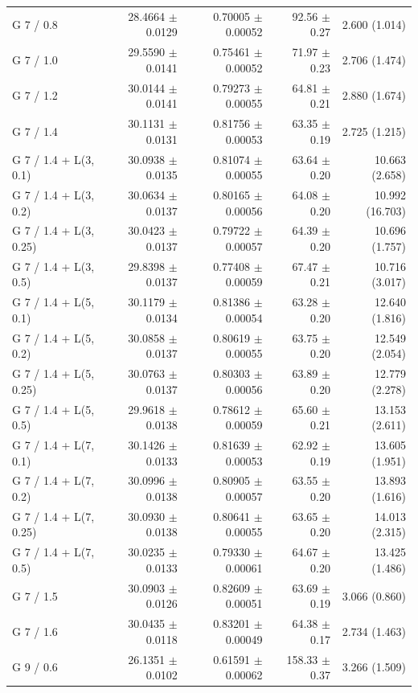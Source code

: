 \begin{longtable}{lrrrr}
G 7 / 0.8 & 28.4664 $\pm$ 0.0129 & 0.70005 $\pm$ 0.00052 & 92.56 $\pm$ 0.27 & 2.600 (1.014) \\
G 7 / 1.0 & 29.5590 $\pm$ 0.0141 & 0.75461 $\pm$ 0.00052 & 71.97 $\pm$ 0.23 & 2.706 (1.474) \\
G 7 / 1.2 & 30.0144 $\pm$ 0.0141 & 0.79273 $\pm$ 0.00055 & 64.81 $\pm$ 0.21 & 2.880 (1.674) \\
G 7 / 1.4 & 30.1131 $\pm$ 0.0131 & 0.81756 $\pm$ 0.00053 & 63.35 $\pm$ 0.19 & 2.725 (1.215) \\
G 7 / 1.4 + L(3, 0.1) & 30.0938 $\pm$ 0.0135 & 0.81074 $\pm$ 0.00055 & 63.64 $\pm$ 0.20 & 10.663 (2.658) \\
G 7 / 1.4 + L(3, 0.2) & 30.0634 $\pm$ 0.0137 & 0.80165 $\pm$ 0.00056 & 64.08 $\pm$ 0.20 & 10.992 (16.703) \\
G 7 / 1.4 + L(3, 0.25) & 30.0423 $\pm$ 0.0137 & 0.79722 $\pm$ 0.00057 & 64.39 $\pm$ 0.20 & 10.696 (1.757) \\
G 7 / 1.4 + L(3, 0.5) & 29.8398 $\pm$ 0.0137 & 0.77408 $\pm$ 0.00059 & 67.47 $\pm$ 0.21 & 10.716 (3.017) \\
G 7 / 1.4 + L(5, 0.1) & 30.1179 $\pm$ 0.0134 & 0.81386 $\pm$ 0.00054 & 63.28 $\pm$ 0.20 & 12.640 (1.816) \\
G 7 / 1.4 + L(5, 0.2) & 30.0858 $\pm$ 0.0137 & 0.80619 $\pm$ 0.00055 & 63.75 $\pm$ 0.20 & 12.549 (2.054) \\
G 7 / 1.4 + L(5, 0.25) & 30.0763 $\pm$ 0.0137 & 0.80303 $\pm$ 0.00056 & 63.89 $\pm$ 0.20 & 12.779 (2.278) \\
G 7 / 1.4 + L(5, 0.5) & 29.9618 $\pm$ 0.0138 & 0.78612 $\pm$ 0.00059 & 65.60 $\pm$ 0.21 & 13.153 (2.611) \\
G 7 / 1.4 + L(7, 0.1) & 30.1426 $\pm$ 0.0133 & 0.81639 $\pm$ 0.00053 & 62.92 $\pm$ 0.19 & 13.605 (1.951) \\
G 7 / 1.4 + L(7, 0.2) & 30.0996 $\pm$ 0.0138 & 0.80905 $\pm$ 0.00057 & 63.55 $\pm$ 0.20 & 13.893 (1.616) \\
G 7 / 1.4 + L(7, 0.25) & 30.0930 $\pm$ 0.0138 & 0.80641 $\pm$ 0.00055 & 63.65 $\pm$ 0.20 & 14.013 (2.315) \\
G 7 / 1.4 + L(7, 0.5) & 30.0235 $\pm$ 0.0133 & 0.79330 $\pm$ 0.00061 & 64.67 $\pm$ 0.20 & 13.425 (1.486) \\
G 7 / 1.5 & 30.0903 $\pm$ 0.0126 & 0.82609 $\pm$ 0.00051 & 63.69 $\pm$ 0.19 & 3.066 (0.860) \\
G 7 / 1.6 & 30.0435 $\pm$ 0.0118 & 0.83201 $\pm$ 0.00049 & 64.38 $\pm$ 0.17 & 2.734 (1.463) \\
G 9 / 0.6 & 26.1351 $\pm$ 0.0102 & 0.61591 $\pm$ 0.00062 & 158.33 $\pm$ 0.37 & 3.266 (1.509) \\

\end{longtable}
